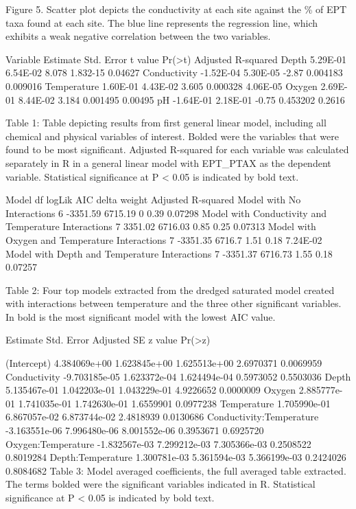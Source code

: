\documentclass[]{article}
\begin{document}
Figure 5. Scatter plot depicts the conductivity at each site against the
\% of EPT taxa found at each site. The blue line represents the
regression line, which exhibits a weak negative correlation between the
two variables.

Variable Estimate Std. Error t value
Pr(\textgreater{}\textbar{}t\textbar{}) Adjusted R-squared Depth
5.29E-01 6.54E-02 8.078 1.832-15 0.04627 Conductivity -1.52E-04 5.30E-05
-2.87 0.004183 0.009016 Temperature 1.60E-01 4.43E-02 3.605 0.000328
4.06E-05 Oxygen 2.69E-01 8.44E-02 3.184 0.001495 0.00495 pH -1.64E-01
2.18E-01 -0.75 0.453202 0.2616

Table 1: Table depicting results from first general linear model,
including all chemical and physical variables of interest. Bolded were
the variables that were found to be most significant. Adjusted R-squared
for each variable was calculated separately in R in a general linear
model with EPT\_PTAX as the dependent variable. Statistical significance
at P \textless{} 0.05 is indicated by bold text.

Model df logLik AIC delta weight Adjusted R-squared Model with No
Interactions 6 -3351.59 6715.19 0 0.39 0.07298 Model with Conductivity
and Temperature Interactions 7 3351.02 6716.03 0.85 0.25 0.07313 Model
with Oxygen and Temperature Interactions 7 -3351.35 6716.7 1.51 0.18
7.24E-02 Model with Depth and Temperature Interactions 7 -3351.37
6716.73 1.55 0.18 0.07257

Table 2: Four top models extracted from the dredged saturated model
created with interactions between temperature and the three other
significant variables. In bold is the most significant model with the
lowest AIC value.

Estimate Std. Error Adjusted SE z value
Pr(\textgreater{}\textbar{}z\textbar{})

(Intercept) 4.384069e+00 1.623845e+00 1.625513e+00 2.6970371 0.0069959
Conductivity -9.703185e-05 1.623372e-04 1.624494e-04 0.5973052 0.5503036
Depth 5.135467e-01 1.042203e-01 1.043229e-01 4.9226652 0.0000009 Oxygen
2.885777e-01 1.741035e-01 1.742630e-01 1.6559901 0.0977238 Temperature
1.705990e-01 6.867057e-02 6.873744e-02 2.4818939 0.0130686
Conductivity:Temperature -3.163551e-06 7.996480e-06 8.001552e-06
0.3953671 0.6925720 Oxygen:Temperature -1.832567e-03 7.299212e-03
7.305366e-03 0.2508522 0.8019284 Depth:Temperature 1.300781e-03
5.361594e-03 5.366199e-03 0.2424026 0.8084682 Table 3: Model averaged
coefficients, the full averaged table extracted. The terms bolded were
the significant variables indicated in R. Statistical significance at P
\textless{} 0.05 is indicated by bold text.
\end{document}
